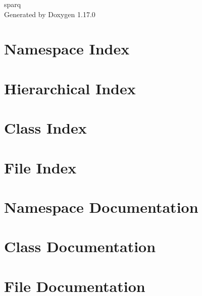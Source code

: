 \documentclass[twoside]{book}
\newcommand{\+}{\discretionary{\mbox{\scriptsize$\hookleftarrow$}}{}{}}
\newcommand{\clearemptydoublepage}{%
    \newpage{\pagestyle{empty}\cleardoublepage}%
  }
\begin{document}
  \raggedbottom
    \hypersetup{pageanchor=false,
                bookmarksnumbered=true,
                pdfencoding=unicode
               }
  \begin{titlepage}
  \vspace*{7cm}
  \begin{center}%
  {\Large sparq}\\
  \vspace*{1cm}
  {\large Generated by Doxygen 1.17.0}\\
  \end{center}
  \end{titlepage}
  \clearemptydoublepage
  \tableofcontents
  \clearemptydoublepage
  \hypersetup{pageanchor=true}




\chapter{Namespace Index}

\chapter{Hierarchical Index}

\chapter{Class Index}

\chapter{File Index}

\chapter{Namespace Documentation}

\chapter{Class Documentation}



\chapter{File Documentation}








  \backmatter
  \newpage
  \clearemptydoublepage
  \printindex
\end{document}
